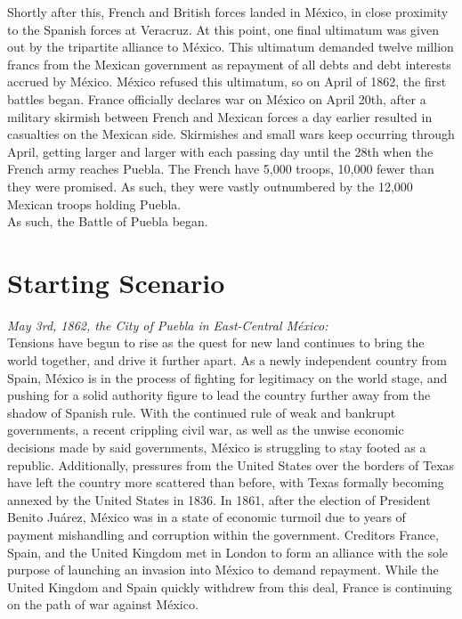 \documentclass[10pt, letterpaper]{article}
\begin{document}
Shortly after this, French and British forces landed in México, in close
proximity to the Spanish forces at Veracruz. At this point, one final
ultimatum was given out by the tripartite alliance to México. This
ultimatum demanded twelve million francs from the Mexican government as
repayment of all debts and debt interests accrued by México. México refused this ultimatum, so on April of 1862, the first battles began. France officially declares war on México on April 20th, after a military skirmish between French and Mexican forces a day earlier resulted in casualties on the Mexican side. Skirmishes and small wars keep occurring through April, getting larger and larger with each passing day until the 28th when the French army reaches Puebla. The French have 5,000 troops, 10,000 fewer than they were promised. As such, they were vastly outnumbered by the 12,000 Mexican troops holding Puebla. \\

As such, the Battle of Puebla began. \\

\newpage
\section{{Starting Scenario}}

\textit{May 3rd, 1862, the City of Puebla in East-Central México:} \\

Tensions have begun to rise as the quest for new land continues to bring
the world together, and drive it further apart. As a newly independent
country from Spain, México is in the process of fighting for legitimacy
on the world stage, and pushing for a solid authority figure to lead the
country further away from the shadow of Spanish rule. With the continued
rule of weak and bankrupt governments, a recent crippling civil war, as
well as the unwise economic decisions made by said governments, México
is struggling to stay footed as a republic. Additionally, pressures from
the United States over the borders of Texas have left the country more
scattered than before, with Texas formally becoming annexed by the
United States in 1836. In 1861, after the election of President Benito
Juárez, México was in a state of economic turmoil due to years of
payment mishandling and corruption within the government. Creditors
France, Spain, and the United Kingdom met in London to form an alliance
with the sole purpose of launching an invasion into México to demand
repayment. While the United Kingdom and Spain quickly withdrew from this
deal, France is continuing on the path of war against México. \\
\end{document}
